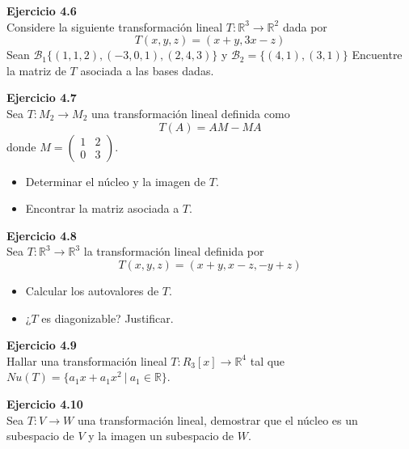\documentclass{article}
\newenvironment{problem}[2][Ejercicio]
    { \begin{mdframed}[backgroundcolor=gray!20] \textbf{#1 #2} \\}
    {  \end{mdframed}}
\begin{document}
\begin{problem}{4.6}
    Considere la siguiente transformación lineal $T : \mathbb{R}^3 \to \mathbb{R}^2$ dada por
\[
T(x,y,z) = (x+y,3x-z)
\]
Sean $\mathcal{B}_1 \{ (1, 1, 2), (-3, 0, 1), (2, 4, 3) \}$ y $\mathcal{B}_2 = \{ (4, 1) , (3, 1) \}$ Encuentre la matriz de $T$ asociada a las bases dadas.
\end{problem}
\begin{problem}{4.7}
    Sea $T : M_2 \to M_2$ una transformación lineal definida como
\[
T(A) = AM - MA
\]
donde $M=\begin{pmatrix} 1 & 2 \\ 0 & 3 \end{pmatrix}.$
\begin{itemize}
\item 
Determinar el núcleo y la imagen de $T$.
\item 
Encontrar la matriz asociada a $T$.
\end{itemize}
\end{problem}

\begin{problem}{4.8}
    Sea $T: \mathbb{R}^3 \to \mathbb{R}^3$ la transformación lineal definida por
\[
T(x,y,z) = (x+y,x-z,-y+z)
\]\begin{itemize}
\item 
Calcular los autovalores de $T$.
\item 
¿$T$ es diagonizable? Justificar.
\end{itemize}
\end{problem}
\begin{problem}{4.9}
    Hallar una transformación lineal $T : R_3[x] \to \mathbb{R}^4$ tal que $Nu(T) = \{ a_1x + a_1x^2 \ | \ a_1 \in \mathbb{R} \}$.
\end{problem}
\begin{problem}{4.10}
    Sea $T:V\to W$ una transformación lineal, demostrar que el núcleo es un subespacio de $V$ y la imagen un subespacio de $W$.
\end{problem}
\end{document}

